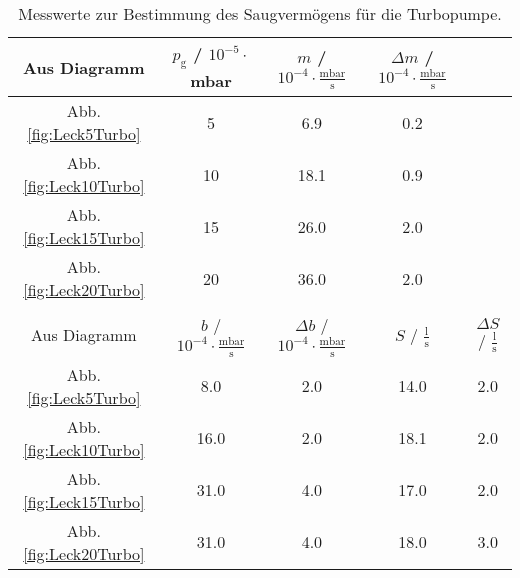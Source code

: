 \begin{table}
   \caption{Messwerte zur Bestimmung des Saugvermögens für die Turbopumpe.}
   \label{tab:SaugLeckTurbo}
   \begin{tabular}{c|c|c|c|c}
     \toprule
     Aus Diagramm & $p_\text{g}$ / $10^{-5}\cdot$mbar & $m$ / $10^{-4}\cdot \frac{\text{mbar}}{\text{s}}$ & $\Delta m$ / $10^{-4}\cdot \frac{\text{mbar}}{\text{s}}$ \\
     \midrule
     Abb. \eqref{fig:Leck5Turbo}  & 5  & 6.9  & 0.2 \\
     Abb. \eqref{fig:Leck10Turbo} & 10 & 18.1 & 0.9 \\
     Abb. \eqref{fig:Leck15Turbo} & 15 & 26.0 & 2.0 \\
     Abb. \eqref{fig:Leck20Turbo} & 20 & 36.0 & 2.0 \\
     \multicolumn{5}{c}{}\\
     \toprule
     Aus Diagramm & $b$ / $10^{-4}\cdot \frac{\text{mbar}}{\text{s}}$ & $\Delta b$ / $10^{-4}\cdot \frac{\text{mbar}}{\text{s}}$ & $S$ / $\frac{\text{l}}{\text{s}}$ & $\Delta S$ / $\frac{\text{l}}{\text{s}}$ \\
     \midrule
     Abb. \eqref{fig:Leck5Turbo}  & 8.0 & 2.0 & 14.0 & 2.0 \\
     Abb. \eqref{fig:Leck10Turbo} & 16.0  & 2.0 & 18.1 & 2.0 \\
     Abb. \eqref{fig:Leck15Turbo} & 31.0  & 4.0 & 17.0 & 2.0 \\
     Abb. \eqref{fig:Leck20Turbo} & 31.0  & 4.0 & 18.0 & 3.0 \\
  \end{tabular}
\end{table}
